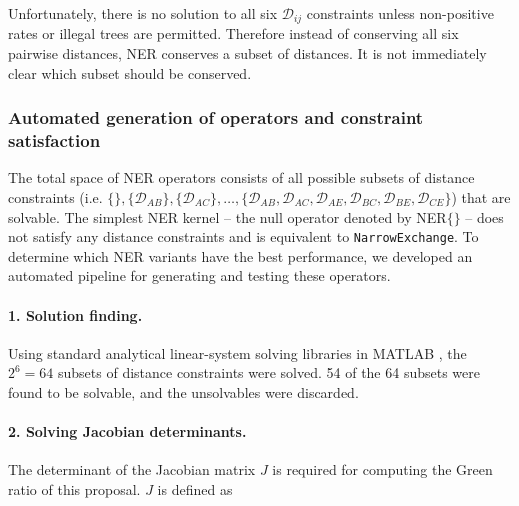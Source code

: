 \documentclass[10pt,letterpaper]{article}
\begin{document}
Unfortunately, there is no solution to all six $\mathcal{D}_{ij}$ constraints unless non-positive rates or illegal trees are permitted.
 Therefore instead of conserving all six pairwise distances, NER conserves a subset of distances. It is not immediately clear which subset should be conserved. 


\subsubsection*{Automated generation of operators and constraint satisfaction}


The total space of NER operators consists of all possible subsets of distance constraints (i.e. $\{\},\{\mathcal{D}_{AB}\}, \{\mathcal{D}_{AC}\}, \dotso , \{\mathcal{D}_{AB}, \mathcal{D}_{AC}, \mathcal{D}_{AE}, \mathcal{D}_{BC}, \mathcal{D}_{BE}, \mathcal{D}_{CE} \}$) that are solvable. 
The simplest NER kernel -- the null operator denoted by NER$\{\}$ -- does not satisfy any distance constraints and is equivalent to \texttt{NarrowExchange}. 
To determine which NER variants have the best performance, we developed an automated pipeline for generating and testing these operators.


\paragraph{1. Solution finding.} Using standard analytical linear-system solving libraries in MATLAB \cite{higham2016matlab}, the $2^6=64$ subsets of distance constraints were solved. 54 of the 64 subsets were found to be solvable, and the unsolvables were discarded.


\paragraph{2. Solving Jacobian determinants.} The determinant of the Jacobian matrix $J$ is required for computing the Green ratio of this proposal. $J$ is defined as 
\end{document}
